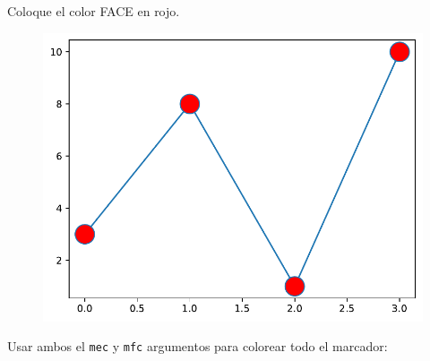 \begin{code} Coloque el color FACE en rojo.

\begin{Shaded}
\begin{Highlighting}[]

\OperatorTok{=}\NormalTok{ np.array([}\NormalTok{, }\NormalTok{, }\NormalTok{, }\NormalTok{])}

\OperatorTok{=} \OperatorTok{=} \OperatorTok{=} \NormalTok{)}
\end{Highlighting}
\end{Shaded}

\begin{figure}
  \centering
  \includegraphics[scale=0.6]{img/grafica1013.pdf}
\end{figure}
\end{code}

Usar ambos el \texttt{mec} y \texttt{mfc} argumentos para colorear todo
el marcador:\\

